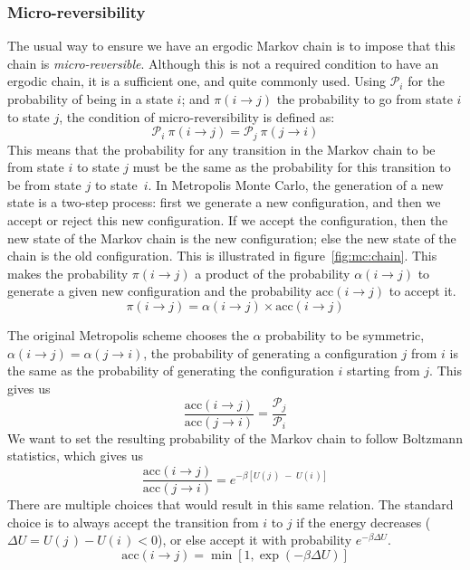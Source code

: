 \documentclass[thesis]{subfiles}
\begin{document}
\subsubsection{Micro-reversibility}

The usual way to ensure we have an ergodic Markov chain is to impose that this
chain is \emph{micro-reversible}. Although this is not a required condition to
have an ergodic chain, it is a sufficient one\cite{Frenkel1997}, and quite
commonly used. Using $\mathcal{P}_i$ for the probability of being in a state
$i$; and $\pi(i \to j)$ the probability to go from state $i$ to state $j$, the
condition of micro-reversibility is defined as:
\[ \mathcal{P}_i \ \pi(i \to j) = \mathcal{P}_j \ \pi(j \to i)\]
This means that the probability for any transition in the Markov chain to be
from state $i$ to state $j$ must be the same as the probability for this
transition to be from state $j$ to state~$i$. In Metropolis Monte Carlo, the
generation of a new state is a two-step process: first we generate a new
configuration, and then we accept or reject this new configuration. If we accept
the configuration, then the new state of the Markov chain is the new
configuration; else the new state of the chain is the old configuration. This is
illustrated in figure~\ref{fig:mc:chain}. This makes the probability $\pi(i \to
j)$ a product of the probability $\alpha(i \to j)$ to generate a given new
configuration and the probability $\text{acc}(i \to j)$ to accept it.
\[\pi(i \to j) = \alpha(i \to j)\times\text{acc}(i \to j)\]

The original Metropolis scheme\cite{Metropolis1953} chooses the $\alpha$
probability to be symmetric, \ie $\alpha(i \to j) = \alpha(j \to i)$, the
probability of generating a configuration $j$ from $i$ is the same as the
probability of generating the configuration $i$ starting from $j$. This gives us
\[ \frac{\text{acc}(i \to j)}{\text{acc}(j \to i)} = \frac{\mathcal{P}_j}{\mathcal{P}_i} \label{eq:mc:acceptance}\]
We want to set the resulting probability of the Markov chain to follow Boltzmann
statistics, which gives us
\[ \frac{\text{acc}(i \to j)}{\text{acc}(j \to i)} = e^{-\beta [U(j\,) \;-\; U(i\,)]} \]
There are multiple choices that would result in this same relation. The standard
choice is to always accept the transition from $i$ to $j$ if the energy
decreases ($\Delta U = U(j\,) - U(i\,) < 0$), or else accept it with probability
$e^{-\beta \Delta U}$.
\[\text{acc}(i \to j) = \min\left[1, \exp\left(-\beta \Delta U\right)\right] \label{eq:mc:acceptance:nvt}\]
\end{document}
